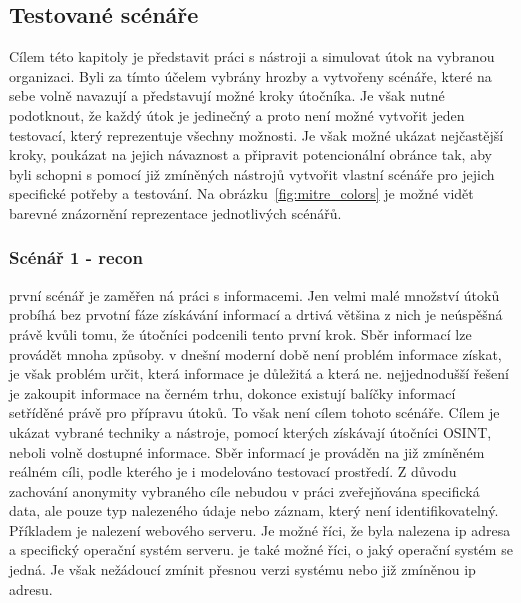 \subsection{Testované scénáře}\label{subsec:testovane-scenare}
Cílem této kapitoly je představit práci s nástroji a simulovat útok na vybranou organizaci.
Byli za tímto účelem vybrány hrozby a vytvořeny scénáře, které na sebe volně navazují a představují možné kroky útočníka.
Je však nutné podotknout, že každý útok je jedinečný a proto není možné vytvořit jeden testovací, který reprezentuje všechny možnosti.
Je však možné ukázat nejčastější kroky, poukázat na jejich návaznost a připravit potencionální obránce tak, aby byli schopni s pomocí již zmíněných nástrojů vytvořit vlastní scénáře pro jejich specifické potřeby a testování.
Na obrázku~\ref{fig:mitre_colors} je možné vidět barevné znázornění reprezentace jednotlivých scénářů.



\subsubsection{Scénář 1 - recon}
první scénář je zaměřen ná práci s informacemi.
Jen velmi malé množství útoků probíhá bez prvotní fáze získávání informací a drtivá většina z nich je neúspěšná právě kvůli tomu, že útočníci podcenili tento první krok.
Sběr informací lze provádět mnoha způsoby.
v dnešní moderní době není problém informace získat, je však problém určit, která informace je důležitá a která ne.
nejjednodušší řešení je zakoupit informace na černém trhu, dokonce existují balíčky informací setříděné právě pro přípravu útoků.
To však není cílem tohoto scénáře.
Cílem je ukázat vybrané techniky a nástroje, pomocí kterých získávají útočníci \ac{OSINT}, neboli volně dostupné informace.
Sběr informací je prováděn na již zmíněném reálném cíli, podle kterého je i modelováno testovací prostředí.
Z důvodu zachování anonymity vybraného cíle nebudou v práci zveřejňována specifická data, ale pouze typ nalezeného údaje nebo záznam, který není identifikovatelný.
Příkladem je nalezení webového serveru.
Je možné říci, že byla nalezena ip adresa a specifický operační systém serveru.
je také možné říci, o jaký operační systém se jedná.
Je však nežádoucí zmínit přesnou verzi systému nebo již zmíněnou ip adresu.


